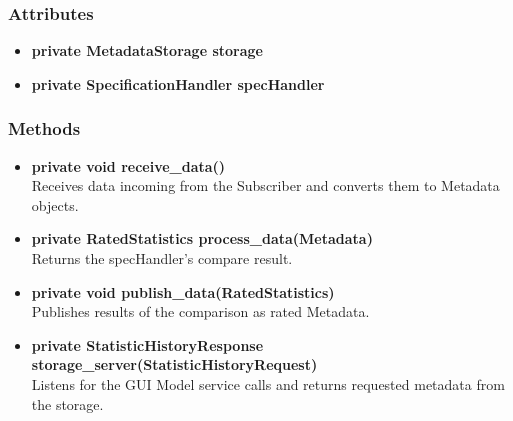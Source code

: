 \subsubsection{Attributes}
\begin{itemize}
	\item \textbf{private MetadataStorage storage}
	\item \textbf{private SpecificationHandler specHandler}
\end{itemize}
\subsubsection{Methods}
\begin{itemize}
	\item \textbf{private void receive\_data()}\\
	Receives data incoming from the Subscriber and converts them to Metadata objects.
	\item \textbf{private RatedStatistics process\_data(Metadata)}\\
	Returns the specHandler's compare result.
	\item \textbf{private void publish\_data(RatedStatistics)}\\
	Publishes results of the comparison as rated Metadata.
	\item \textbf{private StatisticHistoryResponse storage\_server(StatisticHistoryRequest)}\\
	Listens for the GUI Model service calls and returns requested metadata from the storage.
\end{itemize}

\newpage

